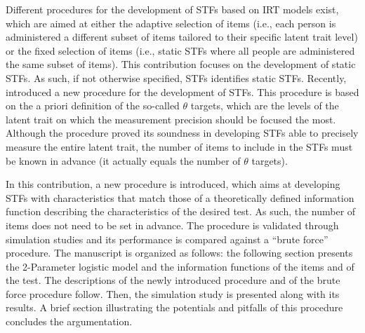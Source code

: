 \documentclass[12pt, a4paper, titilepage]{article}
\begin{document}
Different procedures for the development of STFs based on IRT models exist, which are aimed at either the adaptive selection of items (i.e., each person is administered a different subset of items tailored to their specific latent trait level) or the fixed selection of items (i.e., static STFs where all people are administered the same subset of items). This contribution focuses on the development of static STFs. As such, if not otherwise specified, STFs identifies static STFs.
Recently,  introduced a new procedure for the development of STFs. This procedure is based on the a priori definition of the so-called $\theta$ targets, which are the levels of the latent trait on which the measurement precision should be focused the most. Although the procedure proved its soundness in developing STFs able to precisely measure the entire latent trait, the number of items to include in the STFs must be known in advance (it actually equals the number of $\theta$ targets).

In this contribution, a new procedure is introduced, which aims at developing STFs with characteristics that match those of a theoretically defined information function describing the characteristics of the desired test. As such, the number of items does not need to be set in advance. The procedure is validated through simulation studies and its performance is compared against a “brute force” procedure. The manuscript is organized as follows: the following section presents the 2-Parameter logistic model \cite<2-PL,>{birnbaum1968} and the information functions of the items and of the test. The descriptions of the newly introduced procedure and of the brute force procedure follow. Then, the simulation study is presented along with its results. A brief section illustrating the potentials and pitfalls of this procedure concludes the argumentation.

%
%
%
\end{document}
